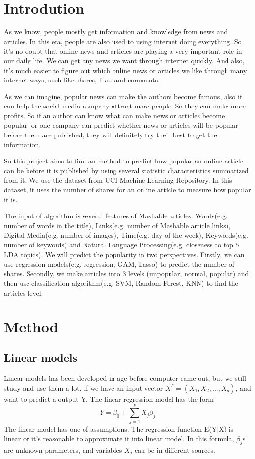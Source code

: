 \documentclass[11pt]{article}
\begin{document}
\section{Introdution}
As we know, people mostly get information and knowledge from news and articles. In this era, people are also used to using internet doing everything. So it’s no doubt that online news and articles are playing a very important role in our daily life. We can get any news we want through internet quickly. And also, it’s much easier to figure out which online news or articles we like through many internet ways, such like shares, likes and comments.  

As we can imagine, popular news can make the authors become famous, also it can help the social media company attract more people. So they can make more profits. So if an author can know what can make news or articles become popular, or one company can predict whether news or articles will be popular before them are published, they will definitely try their best to get the information.  

So this project aims to find an method to predict how popular an online article can be before it is published by using several statistic characteristics summarized from it. We use the dataset from UCI Machine Learning Repository. In this dataset, it uses the number of shares for an online article to measure how popular it is.   

The input of algorithm is several features of Mashable articles: Words(e.g. number of words in the title), Links(e.g. number of Mashable article links), Digital Media(e.g. number of images), Time(e.g. day of the week), Keywords(e.g. number of keywords) and Natural Language Processing(e.g. closeness to top 5 LDA topics). We will predict the popularity in two perspectives. Firstly, we can use regression models(e.g. regression, GAM, Lasso) to predict the number of shares. Secondly, we make articles into 3 levels (unpopular, normal, popular) and then use classification algorithm(e.g. SVM, Random Forest, KNN) to find the articles level.  

\section{Method}
\subsection{Linear models}  
Linear models has been developed in age before computer came out, but we still study and use them a lot. If we have an input vector $X^T=(X_1,X_2,...,X_p)$, and want to predict a output Y. The linear regression model has the form $$Y=\beta_0+\sum_{j=1}^{p} X_j\beta_j$$
The linear model has one of assumptions. The regression function E(Y|X) is linear or it's reasonable to approximate it into linear model. In this formula, $\beta_j$s are unknown parameters, and variables $X_j$ can be in different sources.
\end{document}
